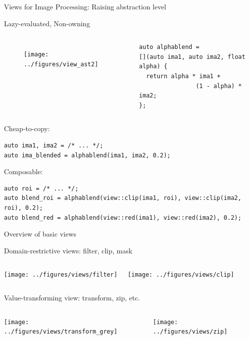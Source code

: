 \documentclass[12pt,aspectratio=169]{beamer}
\begin{document}
\begin{frame}[fragile]{Views for Image Processing: Raising abstraction level}
  \begin{alertblock}{Lazy-evaluated, Non-owning}
    \begin{columns}[T,onlytextwidth]
      \centering
      \begin{figure}
        \texttt{[image: ../figures/view\_ast2]}
      \end{figure}

      \begin{verbatim}
auto alphablend =
[](auto ima1, auto ima2, float alpha) {
  return alpha * ima1 +
                (1 - alpha) * ima2;
};
  \end{verbatim}
    \end{columns}
  \end{alertblock}

  \begin{alertblock}{Cheap-to-copy:}
    \begin{verbatim}
auto ima1, ima2 = /* ... */;
auto ima_blended = alphablend(ima1, ima2, 0.2);
    \end{verbatim}
  \end{alertblock}

  \begin{alertblock}{Composable:}
    \begin{verbatim}
auto roi = /* ... */;
auto blend_roi = alphablend(view::clip(ima1, roi), view::clip(ima2, roi), 0.2);
auto blend_red = alphablend(view::red(ima1), view::red(ima2), 0.2);
    \end{verbatim}
  \end{alertblock}

\end{frame}

\begin{frame}[fragile]{Overview of basic views}
  \begin{alertblock}{Domain-restrictive views: filter, clip, mask}
    \begin{columns}[T,onlytextwidth]
      \vspace{0.5cm}
      \texttt{[image: ../figures/views/filter]}

      \vspace{0.5cm}
      \texttt{[image: ../figures/views/clip]}
    \end{columns}
  \end{alertblock}

  \begin{alertblock}{Value-transforming view: transform, zip, etc.}
    \begin{columns}[T,onlytextwidth]
      \vspace{0.5cm}
      \texttt{[image: ../figures/views/transform\_grey]}

      \vspace{0.5cm}
      \texttt{[image: ../figures/views/zip]}
    \end{columns}
  \end{alertblock}
\end{frame}
\end{document}
